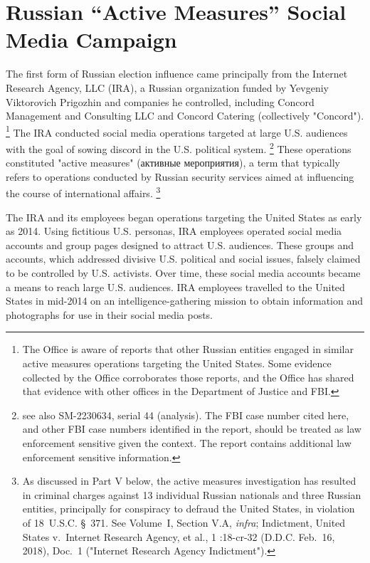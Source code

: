 \section{Russian ``Active Measures'' Social Media Campaign}

The first form of Russian election influence came principally from the Internet Research Agency, LLC (IRA), a Russian organization funded by Yevgeniy Viktorovich Prigozhin and companies he controlled, including Concord Management and Consulting LLC and Concord Catering (collectively "Concord").%
\footnote{The Office is aware of reports that other Russian entities engaged in similar active measures operations targeting the United States.
Some evidence collected by the Office corroborates those reports, and the Office has shared that evidence with other offices in the Department of Justice and FBI.}
The IRA conducted social media operations targeted at large U.S. audiences with the goal of sowing discord in the U.S. political system.%
\footnote{
see also SM-2230634, serial 44 (analysis).
The FBI case number cited here, and other FBI case numbers identified in the report, should be treated as law enforcement sensitive given the context.
The report contains additional law enforcement sensitive information.}
These operations constituted "active measures" (активные мероприятия), a term that typically refers to operations conducted by Russian security services aimed at influencing the course of international affairs.%
\footnote{As discussed in Part V below, the active measures investigation has resulted in criminal charges against 13 individual Russian nationals and three Russian entities, principally for conspiracy to defraud the United States, in violation of 18~U.S.C. \S~371.
See Volume~I, Section V.A, \textit{infra}; Indictment, United States v.\ Internet Research Agency, et al., 1 :18-cr-32 (D.D.C. Feb.~16, 2018), Doc.~1 ("Internet Research Agency Indictment").}

The IRA and its employees began operations targeting the United States as early as 2014.
Using fictitious U.S. personas, IRA employees operated social media accounts and group pages designed to attract U.S. audiences.
These groups and accounts, which addressed divisive U.S. political and social issues, falsely claimed to be controlled by U.S. activists.
Over time, these social media accounts became a means to reach large U.S. audiences.
IRA employees travelled to the United States in mid-2014 on an intelligence-gathering mission to obtain information and photographs for use in their social media posts.

